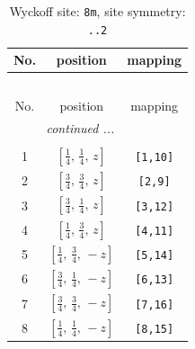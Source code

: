 \documentclass[fleqn,8pt]{jsarticle}
\begin{document}
\renewcommand{\arraystretch}{1.2}
\begin{longtable}{ccc}
\caption{Wyckoff site: {\tt 8m}, site symmetry: {\tt ..2}}
 \\
 \hline \hline
No. & position & mapping \\ \hline \endfirsthead

\multicolumn{2}{l}{\tablename\ \thetable{}} \\
 \hline \hline
No. & position & mapping \\ \hline \endhead

 \hline \hline
\multicolumn{2}{r}{\footnotesize\it continued ...} \\ \endfoot

 \hline \hline
\multicolumn{2}{r}{} \\ \endlastfoot

1 & $\left[ \frac{1}{4},\, \frac{1}{4},\, z \right]$ & {\tt [1,10]} \\ \hline
2 & $\left[ \frac{3}{4},\, \frac{3}{4},\, z \right]$ & {\tt [2,9]} \\ \hline
3 & $\left[ \frac{3}{4},\, \frac{1}{4},\, z \right]$ & {\tt [3,12]} \\ \hline
4 & $\left[ \frac{1}{4},\, \frac{3}{4},\, z \right]$ & {\tt [4,11]} \\ \hline
5 & $\left[ \frac{1}{4},\, \frac{3}{4},\, - z \right]$ & {\tt [5,14]} \\ \hline
6 & $\left[ \frac{3}{4},\, \frac{1}{4},\, - z \right]$ & {\tt [6,13]} \\ \hline
7 & $\left[ \frac{3}{4},\, \frac{3}{4},\, - z \right]$ & {\tt [7,16]} \\ \hline
8 & $\left[ \frac{1}{4},\, \frac{1}{4},\, - z \right]$ & {\tt [8,15]} \\
\end{longtable}
\renewcommand{\arraystretch}{1.2}
\end{document}

